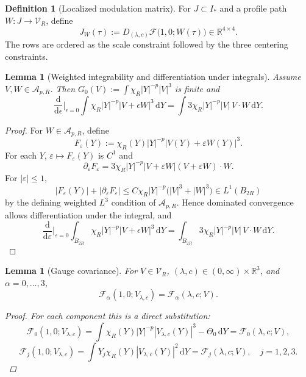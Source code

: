 \documentclass[11pt]{amsart}
\theoremstyle{plain}
\newtheorem{lemma}[theorem]{Lemma}
\theoremstyle{definition}
\newtheorem{definition}[theorem]{Definition}
\theoremstyle{remark}
\newcommand{\dd}{\mathrm d}
\newcommand{\RR}{\mathbb R}
\begin{document}
\begin{definition}[Localized modulation matrix]\label{def:gauge-nondeg}
For \(J\subset I_*\) and a profile path \(W:J\to\mathcal V_R\), define
\[
J_W(\tau):=
D_{(\lambda,c)}\mathcal F\bigl(1,0;W(\tau)\bigr)
\in\mathbb R^{4\times4}.
\]
The rows are ordered as the scale constraint followed by the three centering
constraints.
\end{definition}

\begin{lemma}[Weighted integrability and differentiation under integrals]\label{lem:weighted-finite}
Assume \(V,W\in\mathcal A_{p,R}\). Then \(G_0(V):=\int\chi_R|Y|^{-p}|V|^3\)
is finite and
\[
\frac{\dd}{\dd\epsilon}\Big|_{\epsilon=0}
\int \chi_R|Y|^{-p}|V+\epsilon W|^3\,\dd Y
=\int 3\chi_R|Y|^{-p}|V|\,V\cdot W\,\dd Y.
\]
\end{lemma}
\begin{proof}
For \(W\in\mathcal A_{p,R}\), define
\[
F_\varepsilon(Y):=\chi_R(Y)|Y|^{-p}|V(Y)+\varepsilon W(Y)|^3.
\]
For each \(Y\), \(\varepsilon\mapsto F_\varepsilon(Y)\) is \(C^1\) and
\[
\partial_\varepsilon F_\varepsilon
=3\chi_R|Y|^{-p}|V+\varepsilon W|(V+\varepsilon W)\cdot W.
\]
For \(|\varepsilon|\le1\),
\[
|F_\varepsilon(Y)|+|\partial_\varepsilon F_\varepsilon|
\le C\chi_R|Y|^{-p}\bigl(|V|^3+|W|^3\bigr)\in L^1(B_{2R})
\]
by the defining weighted \(L^3\) condition of \(\mathcal A_{p,R}\).
Hence dominated convergence allows differentiation under the integral, and
\[
\frac{\dd}{\dd\varepsilon}\Big|_{\varepsilon=0}\int_{B_{2R}}\chi_R|Y|^{-p}|V+\epsilon W|^3\,\dd Y
=\int_{B_{2R}}3\chi_R|Y|^{-p}|V|\,V\cdot W\,\dd Y.
\]
\end{proof}

\begin{lemma}[Gauge covariance]\label{lem:gauge-covariance}
For \(V\in\mathcal V_R\), \((\lambda,c)\in(0,\infty)\times\RR^3\), and
\(\alpha=0,\dots,3\),
\[
\mathcal F_\alpha(1,0;V_{\lambda,c})=\mathcal F_\alpha(\lambda,c;V).
\]
\begin{proof}
For each component this is a direct substitution:
\[
\mathcal F_0(1,0;V_{\lambda,c})
=\int\chi_R(Y)|Y|^{-p}|V_{\lambda,c}(Y)|^3-\Theta_0\,\dd Y
=\mathcal F_0(\lambda,c;V),
\]
\[
\mathcal F_j(1,0;V_{\lambda,c})
=\int Y_j\chi_R(Y)|V_{\lambda,c}(Y)|^2\,\dd Y
=\mathcal F_j(\lambda,c;V),\quad j=1,2,3.
\]
\end{proof}
\end{lemma}
\end{document}
